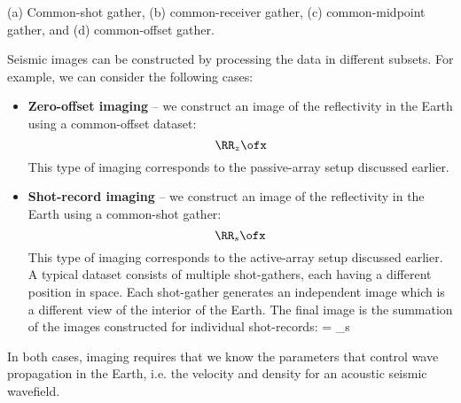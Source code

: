 {(a) Common-shot gather, (b) common-receiver gather, (c)
  common-midpoint gather, and (d) common-offset gather.}

Seismic images can be constructed by processing the data in different
subsets. For example, we can consider the following cases:
\begin{itemize}
\item \textbf{Zero-offset imaging} -- we construct an image of the
  reflectivity in the Earth using a common-offset dataset:
  \[ \RR_z \ofx \]
  This type of imaging corresponds to the passive-array setup
  discussed earlier.
\item \textbf{Shot-record imaging} -- we construct an image of the
  reflectivity in the Earth using a common-shot gather:
  \[ \RR_s \ofx \]
  This type of imaging corresponds to the active-array setup discussed
  earlier. A typical dataset consists of multiple shot-gathers, each
  having a different position in space. Each shot-gather generates an
  independent image which is a different view of the interior of the
  Earth. The final image is the summation of the images constructed
  for individual shot-records:
  \beq 
  \RR\ofx =  \RR_s \ofx 
  \eeq
\end{itemize}
In both cases, imaging requires that we know the parameters that
control wave propagation in the Earth, i.e. the velocity and density
for an acoustic seismic wavefield.
